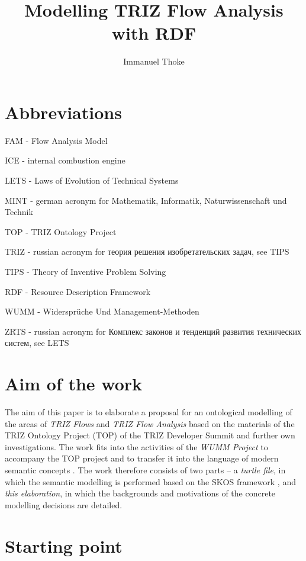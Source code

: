 \documentclass[a4paper,11pt]{article}
\author{Immanuel Thoke}
\title{Modelling TRIZ Flow Analysis with RDF}
\begin{document}
    \maketitle
    \tableofcontents
    \newpage
    \section{Abbreviations}
    FAM - Flow Analysis Model

    ICE - internal combustion engine

    LETS - Laws of Evolution of Technical Systems

    MINT - german acronym for Mathematik, Informatik, Naturwissenschaft und Technik

    TOP - TRIZ Ontology Project

    TRIZ - russian acronym for \foreignlanguage{russian}{теория решения изобретательских задач}, see TIPS

    TIPS - Theory of Inventive Problem Solving 

    RDF - Resource Description Framework 

    WUMM - Widersprüche Und Management-Methoden

    ZRTS - russian acronym for \foreignlanguage{russian}{Комплекс законов и тенденций развития технических систем}, see LETS

    \newpage

    \section{Aim of the work}

    The aim of this paper is to elaborate a proposal for an ontological modelling
    of the areas of \emph{TRIZ Flows} and \emph{TRIZ Flow Analysis} based on the
    materials of the TRIZ Ontology Project (TOP) of the TRIZ Developer Summit
    \cite{TOP} and further own investigations. The work fits into the activities
    of the \emph{WUMM Project} \cite{WUMM} to accompany the TOP project and to
    transfer it into the language of modern semantic concepts
    \cite{WUMMTOP}.  The work therefore consists of two parts -- a
    \emph{turtle file}, in which the semantic modelling is performed based on the
    SKOS framework \cite{SKOS}, and \emph{this elaboration}, in which the
    backgrounds and motivations of the concrete modelling decisions are detailed.

    \section{Starting point} 
\end{document}
